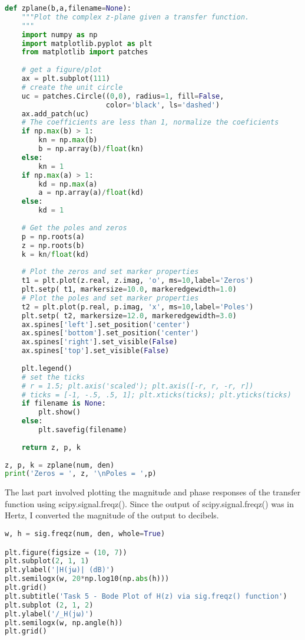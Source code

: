 \documentclass[12pt]{report}
\begin{document}
\begin{lstlisting}[language=Python, caption= Z-plane function]
def zplane(b,a,filename=None):
    """Plot the complex z-plane given a transfer function.
    """
    import numpy as np
    import matplotlib.pyplot as plt
    from matplotlib import patches    
    
    # get a figure/plot
    ax = plt.subplot(111)
    # create the unit circle
    uc = patches.Circle((0,0), radius=1, fill=False,
                        color='black', ls='dashed')
    ax.add_patch(uc)
    # The coefficients are less than 1, normalize the coeficients
    if np.max(b) > 1:
        kn = np.max(b)
        b = np.array(b)/float(kn)
    else:
        kn = 1
    if np.max(a) > 1:
        kd = np.max(a)
        a = np.array(a)/float(kd)
    else:
        kd = 1
        
    # Get the poles and zeros
    p = np.roots(a)
    z = np.roots(b)
    k = kn/float(kd)
    
    # Plot the zeros and set marker properties    
    t1 = plt.plot(z.real, z.imag, 'o', ms=10,label='Zeros')
    plt.setp( t1, markersize=10.0, markeredgewidth=1.0)
    # Plot the poles and set marker properties
    t2 = plt.plot(p.real, p.imag, 'x', ms=10,label='Poles')
    plt.setp( t2, markersize=12.0, markeredgewidth=3.0)
    ax.spines['left'].set_position('center')
    ax.spines['bottom'].set_position('center')
    ax.spines['right'].set_visible(False)
    ax.spines['top'].set_visible(False)
    
    plt.legend()
    # set the ticks
    # r = 1.5; plt.axis('scaled'); plt.axis([-r, r, -r, r])
    # ticks = [-1, -.5, .5, 1]; plt.xticks(ticks); plt.yticks(ticks)
    if filename is None:
        plt.show()
    else:
        plt.savefig(filename)
    
    return z, p, k
    
z, p, k = zplane(num, den)
print('Zeros = ', z, '\nPoles = ',p)
\end{lstlisting}

The last part involved plotting the magnitude and phase responses of the transfer function using scipy.signal.freqz(). Since the output of scipy.signal.freqz() was in Hertz, I converted the magnitude of the output to decibels. 

\begin{lstlisting}[language=Python, caption= Magnitude and Phase Responses]
w, h = sig.freqz(num, den, whole=True)

plt.figure(figsize = (10, 7))
plt.subplot(2, 1, 1)
plt.ylabel('|H(jω)| (dB)')
plt.semilogx(w, 20*np.log10(np.abs(h)))
plt.grid()
plt.subtitle('Task 5 - Bode Plot of H(z) via sig.freqz() function')
plt.subplot (2, 1, 2)
plt.ylabel('/_H(jω)')
plt.semilogx(w, np.angle(h))
plt.grid()
\end{lstlisting}
\end{document}
